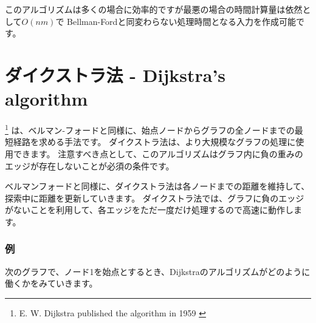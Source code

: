 このアルゴリズムは多くの場合に効率的ですが最悪の場合の時間計算量は依然として$O(nm)$で
Bellman-Fordと同変わらない処理時間となる入力を作成可能です。

\section{ダイクストラ法 - Dijkstra's algorithm}


 \footnote{E. W. Dijkstra published the algorithm in 1959 \cite{dij59}}
は、ベルマン-フォードと同様に、始点ノードからグラフの全ノードまでの最短経路を求める手法です。
ダイクストラ法は、より大規模なグラフの処理に使用できます。
注意すべき点として、このアルゴリズムはグラフ内に負の重みのエッジが存在しないことが必須の条件です。

ベルマンフォードと同様に、ダイクストラ法は各ノードまでの距離を維持して、探索中に距離を更新していきます。
ダイクストラ法では、グラフに負のエッジがないことを利用して、各エッジをただ一度だけ処理するので高速に動作します。

\subsubsection{例}
次のグラフで、ノード1を始点とするとき、Dijkstraのアルゴリズムがどのように働くかをみていきます。

